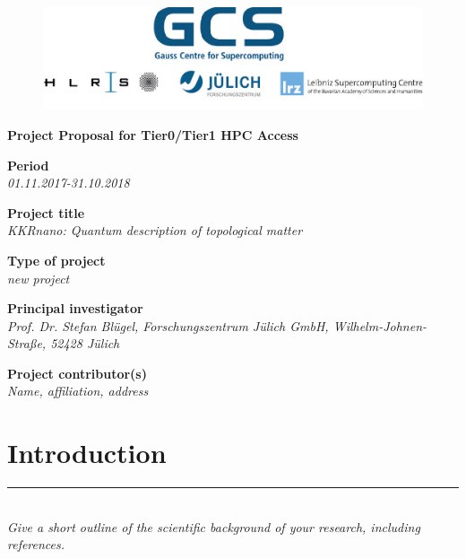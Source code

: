 \documentclass [a4paper, 12pt]{article}
\begin{document}
 
\begin{figure}[H]
\begin{center}
  \includegraphics[scale=0.45]{Figures/GCS-hlrs-fzj-lrz.jpg}\\
\end{center}
\end{figure}

\begin{center}
{\LARGE \bf Project Proposal for Tier0/Tier1 HPC Access} \\

\bigskip
\bigskip
\bigskip
\end{center}
\textbf{Period}\\
\phantom{MM}\textit{01.11.2017-31.10.2018}

\bigskip
\textbf{Project title}\\
\phantom{MM}\textit{KKRnano: Quantum description of topological matter}

\bigskip
\textbf{Type of project}\\
\phantom{MM} \textit{new project}


\bigskip
\textbf{Principal investigator}\\
\phantom{MM} \textit{ Prof. Dr. Stefan Bl{\"u}gel,
Forschungszentrum J{\"u}lich GmbH, 
Wilhelm-Johnen-Straße,
52428 J{\"u}lich 
}

\bigskip
\textbf{Project contributor(s)}\\
\phantom{MM} \textit{Name, affiliation, address}

\newpage

\vfill
\tableofcontents
\vfill

\newpage



\section{Introduction}
\rule{\textwidth}{0.4pt}\\
\textit{Give a short outline of the scientific background of your research, including references.}\\
\end{document}
